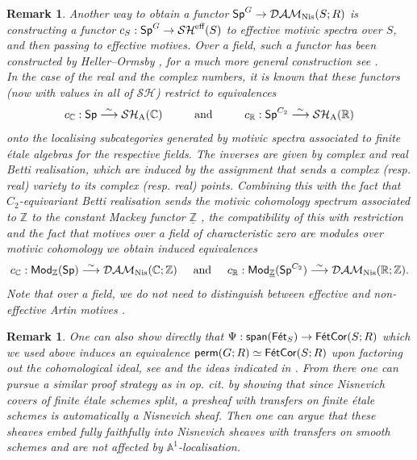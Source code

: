 \documentclass[reqno]{amsart}
\numberwithin{equation}{section}\theoremstyle{thms}
\theoremstyle{defn}
\newtheorem{rem}[equation]{Remark}
\newcommand{\nA}{\tn{A}}
\newcommand{\bA}{\mathbb{A}}
\newcommand{\bC}{\mathbb{C}}
\newcommand{\bR}{\mathbb{R}}
\newcommand{\bZ}{\mathbb{Z}}
\newcommand{\tn}[1]{\textnormal{#1}}
\newcommand{\tsf}[1]{\textsf{\textup{#1}}}
\newcommand{\mcal}[1]{\mathcal{#1}}
\newcommand{\underl}[1]{\underline{#1}}
\newcommand{\Mod}{\tsf{Mod}}
\newcommand{\spans}{\tsf{span}}
\newcommand{\spec}{\tsf{Sp}}
\newcommand{\specg}{\tsf{Sp}^G}
\newcommand{\permgr}{\tsf{perm}(G;R)}
\newcommand{\fets}{\tsf{Fét}_S}
\newcommand{\corfets}[1]{\tsf{FétCor}(S;#1)}
\begin{document}
\begin{rem}
Another way to obtain a functor $\specg \to \mcal{DAM}_{\tn{Nis}}(S;R)$ is constructing a functor $c_S: \specg \to \mcal{SH}^\tn{eff}(S)$ to effective motivic spectra over $S$, and then passing to effective motives. Over a field, such a functor has been constructed by Heller--Ormsby \cite{ho16}, for a much more general construction see \cite[§10.2]{bh21}. \\
In the case of the real and the complex numbers, it is known \cite{lev14,ho16,ho18} that these functors (now with values in all of $\mcal{SH}$) restrict to equivalences
$$c_{\bC}: \spec \stackrel{\sim}{\longrightarrow} \mcal{SH}_{\nA}(\bC) \hspace{1cm} \tn{and} \hspace{1cm} c_{\bR}: \spec^{C_2} \stackrel{\sim}{\longrightarrow}\mcal{SH}_{\nA}(\bR)$$
onto the localising subcategories generated by motivic spectra associated to finite étale algebras for the respective fields. The inverses are given by complex and real Betti realisation, which are induced by the assignment that sends a complex (resp. real) variety to its complex (resp. real) points.
Combining this with the fact that $C_2$-equivariant Betti realisation sends the motivic cohomology spectrum associated to $\bZ$ to the constant Mackey functor $\underl{\bZ}$ \cite[Theorem 4.17]{ho16}, the compatibility of this with restriction \cite[Recollection 1.19]{bhs22} and the fact that motives over a field of characteristic zero are modules over motivic cohomology \cite{ro08} we obtain induced equivalences
$$c_{\bC}: \Mod_{\bZ}(\spec) \stackrel{\sim}{\longrightarrow} \mcal{DAM}_{\tn{Nis}}(\bC;\bZ) \hspace{0.5cm} \tn{and} \hspace{0.5cm} c_{\bR}: \Mod_{\underl{\bZ}}(\spec^{C_2}) \stackrel{\sim}{\longrightarrow} \mcal{DAM}_{\tn{Nis}}(\bR;\bZ).$$
Note that over a field, we do not need to distinguish between effective and non-effective Artin motives \cite[Remark 7.9]{bg23}.
\end{rem}

\begin{rem}\label{rem:alternativeproof}
One can also show directly that $\Psi: \spans(\fets) \to \corfets{R}$ which we used above induces an equivalence $\permgr \simeq \corfets{R}$ upon factoring out the cohomological ideal, see \cite[Proposition 4.17]{bg23} and the ideas indicated in \cite[Remark 6.5]{bg23}. From there one can pursue a similar proof strategy as in op. cit. by showing that since Nisnevich covers of finite étale schemes split, a presheaf with transfers on finite étale schemes is automatically a Nisnevich sheaf. Then one can argue that these sheaves embed fully faithfully into Nisnevich sheaves with transfers on smooth schemes and are not affected by $\bA^1$-localisation.
\end{rem}
\end{document}
